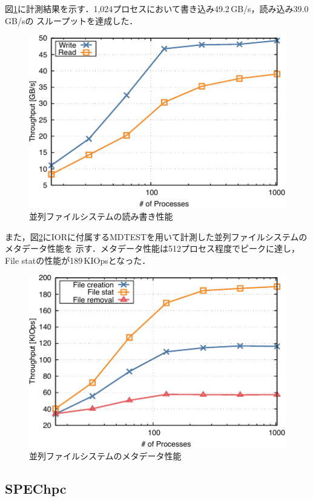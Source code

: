 ﻿\documentclass[submit,techrep,noauthor]{ipsj}
\begin{document}
図\ref{fig:ior}に計測結果を示す．1,024プロセスにおいて書き込み49.2\,GB/s，読み込み39.0\,GB/sの
スループットを達成した．

\begin{figure}[tb]
  \centering
  \includegraphics{figs/ior.pdf}
  \caption{並列ファイルシステムの読み書き性能}\label{fig:ior}
\end{figure}

また，図\ref{fig:mdtest}にIORに付属するMDTESTを用いて計測した並列ファイルシステムのメタデータ性能を
示す．メタデータ性能は512プロセス程度でピークに達し，File statの性能が189\,KIOpsとなった．

\begin{figure}[tb]
  \centering
  \includegraphics{figs/mdtest.pdf}
  \caption{並列ファイルシステムのメタデータ性能}\label{fig:mdtest}
\end{figure}

\subsection{SPEChpc}\label{sec:spechpc}
\end{document}
